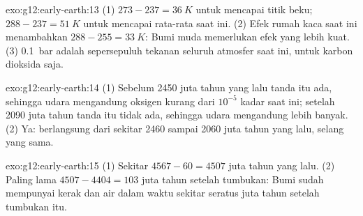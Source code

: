 \begin{solution}{exo:g12:early-earth:13}
(1) $273 - 237 = \qty{36}{K}$ untuk mencapai titik beku; $288 - 237 = \qty{51}{K}$
untuk mencapai rata-rata saat ini. (2) Efek rumah kaca saat ini menambahkan $288 - 255 =
\qty{33}{K}$: Bumi muda memerlukan efek yang lebih kuat. (3) \qty{0.1}{bar}
adalah sepersepuluh tekanan seluruh atmosfer saat ini, untuk karbon dioksida
saja.
\end{solution}

\begin{solution}{exo:g12:early-earth:14}
(1) Sebelum 2450 juta tahun yang lalu tanda itu ada, sehingga udara mengandung
oksigen kurang dari $10^{-5}$ kadar saat ini; setelah 2090 juta tahun tanda itu
tidak ada, sehingga udara mengandung lebih banyak. (2) Ya:  berlangsung dari sekitar 2460 sampai 2060 juta tahun yang lalu, selang
yang sama.
\end{solution}

\begin{solution}{exo:g12:early-earth:15}
(1) Sekitar $4567 - 60 = 4507$ juta tahun yang lalu. (2) Paling lama $4507 - 4404 =
103$ juta tahun setelah tumbukan: Bumi sudah mempunyai kerak dan air dalam
waktu sekitar seratus juta tahun setelah tumbukan itu.
\end{solution}

